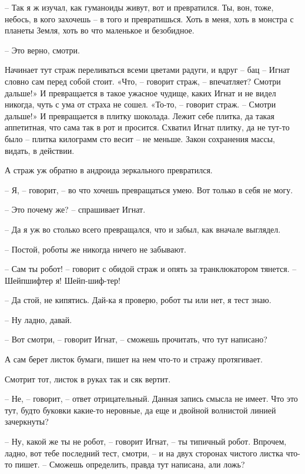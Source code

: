 \documentclass[ebook,oneside,final,openright]{memoir}
\begin{document}
– Так я ж изучал, как гуманоиды живут, вот и превратился. Ты, вон, тоже, небось, в кого захочешь – в того и превратишься. Хоть в меня, хоть в монстра с планеты Земля, хоть во что маленькое и безобидное. \par
– Это верно, смотри. \par
\par
Начинает тут страж переливаться всеми цветами радуги, и вдруг – бац – Игнат словно сам перед собой стоит. «Что, – говорит страж, – впечатляет? Смотри дальше!» И превращается в такое ужасное чудище, каких Игнат и не видел никогда, чуть с ума от страха не сошел. «То-то, – говорит страж. – Смотри дальше!» И превращается в плитку шоколада. Лежит себе плитка, да такая аппетитная, что сама так в рот и просится. Схватил Игнат плитку, да не тут-то было – плитка килограмм сто весит – не меньше. Закон сохранения массы, видать, в действии. \par
\par
А страж уж обратно в андроида зеркального превратился. \par
– Я, – говорит, – во что хочешь превращаться умею. Вот только в себя не могу. \par
– Это почему же? – спрашивает Игнат.\par
– Да я уж во столько всего превращался, что и забыл, как вначале выглядел. \par
– Постой, роботы же никогда ничего не забывают. \par
– Сам ты робот! – говорит с обидой страж и опять за транклюкатором тянется. – Шейпшифтер я! Шейп-шиф-тер! \par
– Да стой, не кипятись. Дай-ка я проверю, робот ты или нет, я тест знаю. \par
– Ну ладно, давай. \par
– Вот смотри, – говорит Игнат, – сможешь прочитать, что тут написано? \par
А сам берет листок бумаги, пишет на нем что-то и стражу протягивает. \par
Смотрит тот, листок в руках так и сяк вертит. \par
– Не, – говорит, – ответ отрицательный. Данная запись смысла не имеет. Что это тут, будто буковки какие-то неровные, да еще и двойной волнистой линией зачеркнуты? \par
– Ну, какой же ты не робот, – говорит Игнат, – ты типичный робот. Впрочем, ладно, вот тебе последний тест, смотри, – и на двух сторонах чистого листка что-то пишет. – Сможешь определить, правда тут написана, али ложь? \par
\end{document}
